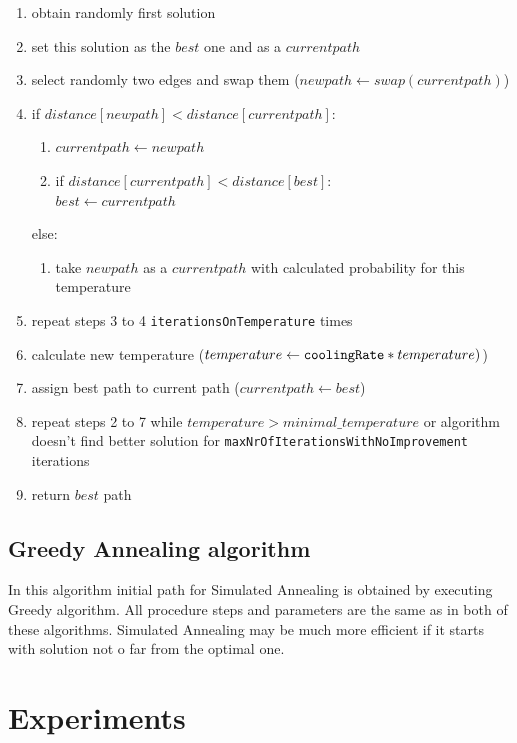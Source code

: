 \documentclass[titlepage]{article}
\begin{document}
\begin{enumerate}
	\item obtain randomly first solution
	\item set this solution as the $best$ one and as a $currentpath$
	\item select randomly two edges and swap them ($newpath \leftarrow swap(currentpath)$)
	\item if $distance[newpath] < distance[currentpath]$:
	\begin{enumerate}[label*=\arabic*.]
		\item $currentpath \leftarrow newpath$
		\item if $distance[currentpath] < distance[best]$: \\
		\hspace*{5mm} $best \leftarrow currentpath$
	\end{enumerate}
	else:
	\begin{enumerate}[label*=\arabic*.]
		\item take $newpath$ as a $currentpath$ with calculated probability for this temperature
	\end{enumerate}
	\item repeat steps 3 to 4 \texttt{iterationsOnTemperature} times
	\item calculate new temperature ($temperature \leftarrow \mbox{\texttt{coolingRate}}*temperature)$)
	\item assign best path to current path ($currentpath \leftarrow best$)
	\item repeat steps 2 to 7 while $temperature > minimal\_temperature$ or algorithm doesn't find better solution for \texttt{maxNrOfIterationsWithNoImprovement} iterations
	\item return $best$ path
	
\end{enumerate}

\subsection{Greedy Annealing algorithm}

In this algorithm initial path for Simulated Annealing is obtained by executing Greedy algorithm. All procedure steps and parameters are the same as in both of these algorithms. Simulated Annealing may be much more efficient if it starts with solution not o far from the optimal one. 

\section{Experiments}
\end{document}
